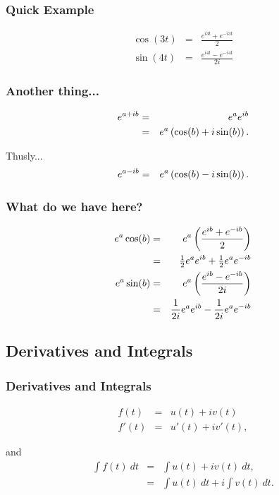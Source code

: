 \begin{frame}
  \frametitle{Quick Example}

  \begin{eqnarray*}
    \cos(3t) & = & \frac{e^{i3t}+e^{-i3t}}{2} \\
    \sin(4t) & = & \frac{e^{i4t}-e^{-i4t}}{2i}
  \end{eqnarray*}

\end{frame}


\begin{frame}
  \frametitle{Another thing...}

  \begin{eqnarray*}
    e^{a+ib} & = & e^a e^{ib} \\
    & = & e^a \left( \cos(b) + i \sin(b) \right).
  \end{eqnarray*}

  Thusly...
  \begin{eqnarray*}
    e^{a-ib} & = & e^a \left( \cos(b) - i \sin(b) \right).
  \end{eqnarray*}

\end{frame}


\begin{frame}
  \frametitle{What do we have here?}

  \begin{eqnarray*}
    e^a \cos(b) & = & e^a \left( \frac{e^{ib}+e^{-ib}}{2} \right) \\
    & = & \mbox{$\frac{1}{2}$} e^a e^{ib} +\mbox{$\frac{1}{2}$} e^a e^{-ib} \\
    e^a \sin(b) & = & e^a \left( \frac{e^{ib}-e^{-ib}}{2i} \right) \\
    & = & \frac{1}{2i} e^a e^{ib} - \frac{1}{2i} e^a e^{-ib}
  \end{eqnarray*}

\end{frame}

\subsection{Derivatives and Integrals}

\begin{frame}
  \frametitle{Derivatives and Integrals}

  \begin{eqnarray*}
    f(t) & = & u(t) + i v(t) \\
    f'(t) & = & u'(t) + i v'(t),
  \end{eqnarray*}

  and
  \begin{eqnarray*}
    \int f(t) ~ dt & = & \int u(t) + i v(t) ~ dt, \\
    & = & \int u(t) ~ dt + i \int v(t) ~ dt.
  \end{eqnarray*}

\end{frame}


